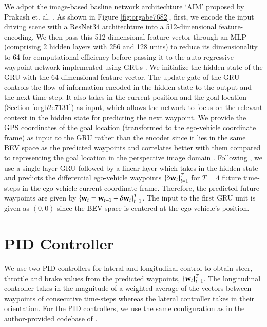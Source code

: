 \documentclass[12pt, letterpaper,cleardoubleempty,BCOR1cm]{scrbook}
\begin{document}
We adpot the image-based basline network architechture `AIM' proposed by Prakash
et. al. \cite{Prakash2021}.  As shown in Figure \ref{fig:orgabe7682}, first, we encode the input
driving scene with a ResNet34 architechture into a 512-dimensional
feature-encoding. We then pass this 512-dimensional feature vector through an
MLP (comprising 2 hidden layers with 256 and 128 units) to reduce its
dimensionality to 64 for computational efficiency before passing it to the
auto-regressive waypoint network implemented using GRUs \cite{Cho2014}. We
initialize the hidden state of the GRU with the 64-dimensional feature
vector. The update gate of the GRU controls the flow of information encoded in
the hidden state to the output and the next time-step. It also takes in the
current position and the goal location (Section \ref{orgb2e7131}) as input, which allows the
network to focus on the relevant context in the hidden state for predicting the
next waypoint.  We provide the GPS coordinates of the goal location (transformed
to the ego-vehicle coordinate frame) as input to the GRU rather than the encoder
since it lies in the same BEV space as the predicted waypoints and correlates
better with them compared to representing the goal location in the perspective
image domain \cite{Chen2019}. Following \cite{Filos2020}, we use a single layer
GRU followed by a linear layer which takes in the hidden state and predicts the
differential ego-vehicle waypoints \(\left\lbrace \delta \textbf w_{t} \right\rbrace_{t=1}^{T}\) for \(T=4\)
future time-steps in the ego-vehicle current coordinate frame. Therefore, the
predicted future waypoints are given by \(\left\lbrace \textbf w_{t}=\textbf w_{t-1} +\delta \textbf
w_{t} \right\rbrace_{t=1}^{T}\). The input to the first GRU unit is given as \((0,0)\) since
the BEV space is centered at the ego-vehicle’s position.

\section{PID Controller}
\label{sec:org649e8f0}
We use two PID controllers for lateral and longitudinal control to obtain steer,
throttle and brake values from the predicted waypoints, \(\left\lbrace \textbf
w_{t} \right\rbrace_{t=1}^{T}\). The longitudinal controller takes in the magnitude of a
weighted average of the vectors between waypoints of consecutive time-steps
whereas the lateral controller takes in their orientation. For the PID
controllers, we use the same configuration as in the author-provided codebase of
\cite{Chen2019}.
\end{document}
